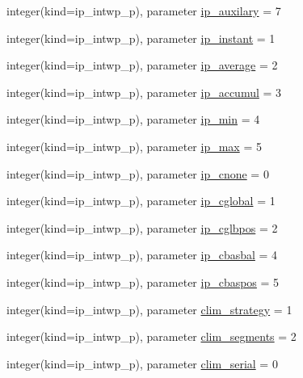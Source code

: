 \begin{DoxyCompactItemize}
\item 
integer(kind=ip\+\_\+intwp\+\_\+p), parameter \hyperlink{classmod__oasis__parameters_a4e90463865a09309212e947e8c8546ac}{ip\+\_\+auxilary} = 7
\item 
integer(kind=ip\+\_\+intwp\+\_\+p), parameter \hyperlink{classmod__oasis__parameters_a1028581caadcb9d7506b25c6cd3efd01}{ip\+\_\+instant} = 1
\item 
integer(kind=ip\+\_\+intwp\+\_\+p), parameter \hyperlink{classmod__oasis__parameters_a5e40e91da22fca8f2b6a9d4f1c1ace5d}{ip\+\_\+average} = 2
\item 
integer(kind=ip\+\_\+intwp\+\_\+p), parameter \hyperlink{classmod__oasis__parameters_adfaf98517b8396e4ba667f2f8bcd0ed5}{ip\+\_\+accumul} = 3
\item 
integer(kind=ip\+\_\+intwp\+\_\+p), parameter \hyperlink{classmod__oasis__parameters_a194cfc3b7f2d515492e04fd6e8931c60}{ip\+\_\+min} = 4
\item 
integer(kind=ip\+\_\+intwp\+\_\+p), parameter \hyperlink{classmod__oasis__parameters_abe7b7d586b50bd7c7d77c7834efa2801}{ip\+\_\+max} = 5
\item 
integer(kind=ip\+\_\+intwp\+\_\+p), parameter \hyperlink{classmod__oasis__parameters_ae043e4e2c2b7f04fec7d8c061ef52934}{ip\+\_\+cnone} = 0
\item 
integer(kind=ip\+\_\+intwp\+\_\+p), parameter \hyperlink{classmod__oasis__parameters_ae251e3ac1c9c82ae5db2a768d2d59d5f}{ip\+\_\+cglobal} = 1
\item 
integer(kind=ip\+\_\+intwp\+\_\+p), parameter \hyperlink{classmod__oasis__parameters_aec700ad0c6a11dd35e5d6c2afb745fd0}{ip\+\_\+cglbpos} = 2
\item 
integer(kind=ip\+\_\+intwp\+\_\+p), parameter \hyperlink{classmod__oasis__parameters_aaa7ead98ff7d53acfd539a32fca9e2c7}{ip\+\_\+cbasbal} = 4
\item 
integer(kind=ip\+\_\+intwp\+\_\+p), parameter \hyperlink{classmod__oasis__parameters_a3b96d31bbe142d84df2b93880498936f}{ip\+\_\+cbaspos} = 5
\item 
integer(kind=ip\+\_\+intwp\+\_\+p), parameter \hyperlink{classmod__oasis__parameters_a611cae6f3c65a75f26e76b2f88f34037}{clim\+\_\+strategy} = 1
\item 
integer(kind=ip\+\_\+intwp\+\_\+p), parameter \hyperlink{classmod__oasis__parameters_a7427036a6530871a0f49c0fb75f2b3ef}{clim\+\_\+segments} = 2
\item 
integer(kind=ip\+\_\+intwp\+\_\+p), parameter \hyperlink{classmod__oasis__parameters_a5c410369e763f9156d0ce1c82e866265}{clim\+\_\+serial} = 0

\end{DoxyCompactItemize}
